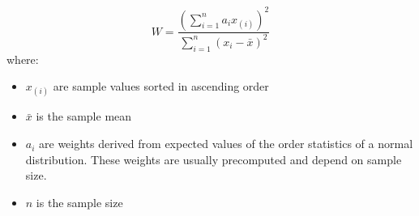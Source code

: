 \documentclass[preview]{standalone}
\begin{document}
{\Large
\[
W=\frac{(\sum^n_{i=1}a_ix_{(i)})^2}{\sum^n_{i=1}(x_i-\bar{x})^2}
\]
}
where:
\begin{itemize}
	\setlength\itemsep{0.1em}
	\item $x_{(i)}$ are sample values sorted in ascending order
	\item $\bar{x}$ is the sample mean
	\item $a_i$ are weights derived from expected values of the order statistics of a normal distribution. These weights are usually precomputed and depend on sample size.
	\item $n$ is the sample size
\end{itemize}
\end{document}
